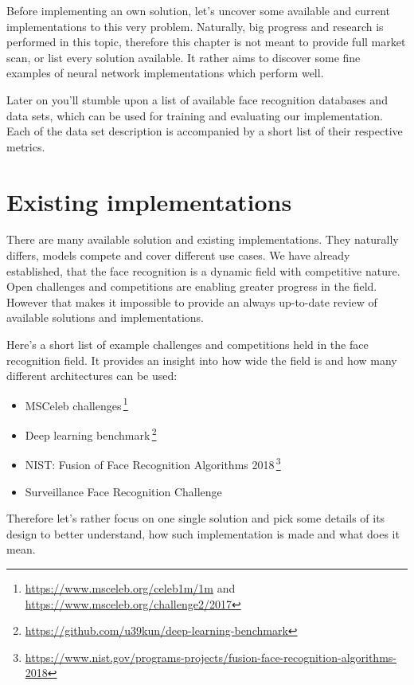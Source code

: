 Before implementing an own solution, let's uncover some available and current implementations to this very problem. Naturally, big progress and research is performed in this topic, therefore this chapter is not meant to provide full market scan, or list every solution available. It rather aims to discover some fine examples of neural network implementations which perform well.

Later on you'll stumble upon a list of available face recognition databases and data sets, which can be used for training and evaluating our implementation. Each of the data set description is accompanied by a short list of their respective metrics.

\section{Existing implementations}

There are many available solution and existing implementations. They naturally differs, models compete and cover different use cases. We have already established, that the face recognition is a dynamic field with competitive nature. Open challenges and competitions are enabling greater progress in the field. However that makes it impossible to provide an always up-to-date review of available solutions and implementations.

Here's a short list of example challenges and competitions held in the face recognition field. It provides an insight into how wide the field is and how many different architectures can be used:

\begin{itemize}
    \item MSCeleb challenges\,\footnote{\url{https://www.msceleb.org/celeb1m/1m} and \url{https://www.msceleb.org/challenge2/2017}}
    \item Deep learning benchmark\,\footnote{\url{https://github.com/u39kun/deep-learning-benchmark}}
    \item NIST: Fusion of Face Recognition Algorithms 2018\,\footnote{\url{https://www.nist.gov/programs-projects/fusion-face-recognition-algorithms-2018}}
    \item Surveillance Face Recognition Challenge\,\cite{sur_challenge}
\end{itemize}

Therefore let's rather focus on one single solution and pick some details of its design to better understand, how such implementation is made and what does it mean.

